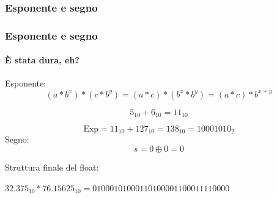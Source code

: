 \documentclass{beamer}
\begin{document}
  \subsubsection{Esponente e segno}
  \begin{frame}
  \frametitle{Esponente e segno}
  \framesubtitle{È stata dura, eh?}
  		
  		Esponente:
  		\vspace{1em}
  		$$(a*b^{x}) * (c * b^{y}) = (a*c) * (b^{x} * b^{y}) = (a*c) * b^{x+y}$$
  		
  		$$5_{10} + 6_{10} = 11_{10}$$
    
    $$\text{Exp} = 11_{10} + 127_{10} = 138_{10} = 10001010_{2}$$
   	Segno:
   	\vspace{1em}
    $$s = 0 \oplus 0 = 0$$
    
    \pause
		Struttura finale del float:    
    
    \vspace{1em}
   
    $32.375_{10} * 76.15625_{10} = 01000101000110100001100011110000$
  \end{frame}
\end{document}
